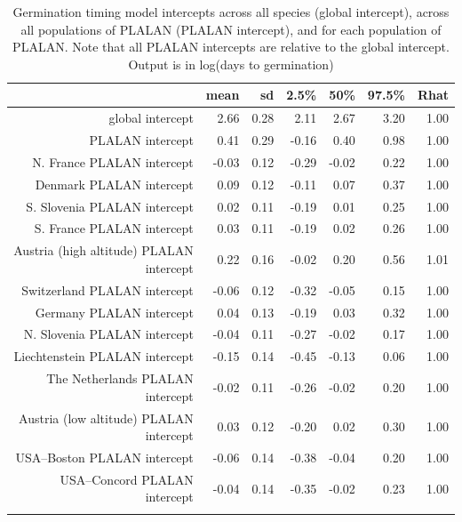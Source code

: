 \documentclass[12pt]{article}\usepackage[]{graphicx}\usepackage[]{color}
\begin{document}
\begin{longtable}{rrrrrrr}
\caption{Germination timing model intercepts across all species (global intercept), across all populations of PLALAN (PLALAN intercept), and for each population of PLALAN. Note that all PLALAN intercepts are relative to the global intercept.  Output is in log(days to germination)} \\ 
  & mean & sd & 2.5\% & 50\% & 97.5\% & Rhat \\ 
  \hline
global intercept & 2.66 & 0.28 & 2.11 & 2.67 & 3.20 & 1.00 \\ 
  PLALAN intercept & 0.41 & 0.29 & -0.16 & 0.40 & 0.98 & 1.00 \\ 
  N. France PLALAN intercept & -0.03 & 0.12 & -0.29 & -0.02 & 0.22 & 1.00 \\ 
  Denmark PLALAN intercept & 0.09 & 0.12 & -0.11 & 0.07 & 0.37 & 1.00 \\ 
  S. Slovenia PLALAN intercept & 0.02 & 0.11 & -0.19 & 0.01 & 0.25 & 1.00 \\ 
  S. France PLALAN intercept & 0.03 & 0.11 & -0.19 & 0.02 & 0.26 & 1.00 \\ 
  Austria (high altitude) PLALAN intercept & 0.22 & 0.16 & -0.02 & 0.20 & 0.56 & 1.01 \\ 
  Switzerland PLALAN intercept & -0.06 & 0.12 & -0.32 & -0.05 & 0.15 & 1.00 \\ 
  Germany PLALAN intercept & 0.04 & 0.13 & -0.19 & 0.03 & 0.32 & 1.00 \\ 
  N. Slovenia PLALAN intercept & -0.04 & 0.11 & -0.27 & -0.02 & 0.17 & 1.00 \\ 
  Liechtenstein PLALAN intercept & -0.15 & 0.14 & -0.45 & -0.13 & 0.06 & 1.00 \\ 
  The Netherlands PLALAN intercept & -0.02 & 0.11 & -0.26 & -0.02 & 0.20 & 1.00 \\ 
  Austria (low altitude) PLALAN intercept & 0.03 & 0.12 & -0.20 & 0.02 & 0.30 & 1.00 \\ 
  USA--Boston PLALAN intercept & -0.06 & 0.14 & -0.38 & -0.04 & 0.20 & 1.00 \\ 
  USA--Concord PLALAN intercept & -0.04 & 0.14 & -0.35 & -0.02 & 0.23 & 1.00 \\ 
  \hline
\label{tab:mod_time_intercept}
\end{longtable}
\end{document}
